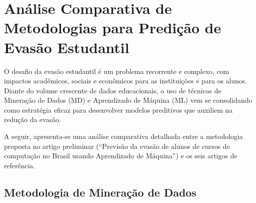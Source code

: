 \documentclass[english, spanish, brazilian]{RBIEarticle} %
\begin{document}
\section{Análise Comparativa de Metodologias para Predição de Evasão Estudantil}
O desafio da evasão estudantil é um problema recorrente e complexo, com impactos acadêmicos, sociais e econômicos para as instituições e para os alunos. Diante do volume crescente de dados educacionais, o uso de técnicas de Mineração de Dados (MD) e Aprendizado de Máquina (ML) vem se consolidando como estratégia eficaz para desenvolver modelos preditivos que auxiliem na redução da evasão.

A seguir, apresenta-se uma análise comparativa detalhada entre a metodologia proposta no artigo preliminar (“Previsão da evasão de alunos de cursos de computação no Brasil usando Aprendizado de Máquina”) e os seis artigos de referência.

\newpage

\subsection{Metodologia de Mineração de Dados}
\end{document}
